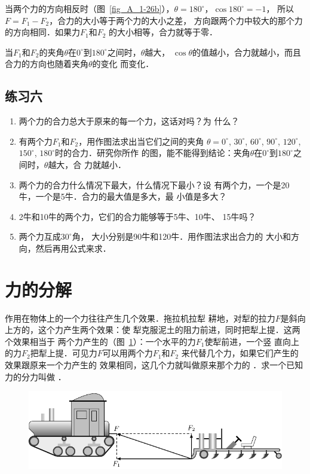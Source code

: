     当两个力的方向相反时（图~\ref{fig_A_1-26b}），$\theta =180^\circ$，$\cos 180^\circ=-1$，
所以$F=F_1-F_2$，合力的大小等于两个力的大小之差，
方向跟两个力中较大的那个力的方向相同．如果力$F_1$和$F_2$
的大小相等，合力就等于零．

    当$F_1$和$F_2$的夹角$\theta$在$0^\circ$到$180^\circ$之间时，$\theta$越大，
$\cos\theta$的值越小，合力就越小，而且合力的方向也随着夹角$\theta$的变化
而变化．


\subsection*{练习六} 
\begin{enumerate} 
\item 两个力的合力总大于原来的每一个力，这话对吗？为
什么？

\item 有两个力$F_1$和$F_2$，用作图法求出当它们之间的夹角
$\theta =0^\circ$, $30^\circ$, $60^\circ$, $90^\circ$, $120^\circ$, $150^\circ$, $180^\circ$时的合力．研究你所作
的图，能不能得到结论：夹角$\theta$在$0^\circ$到$180^\circ$之间时，$\theta $越大，合
力就越小．
\item 两个力的合力什么情况下最大，什么情况下最小？设
有两个力，一个是20牛，一个是5牛．合力的最大值是多大，最
小值是多大？
\item 2牛和10牛的两个力，它们的合力能够等于5牛、10牛、
15牛吗？
\item   两个力互成$30^\circ$角， 大小分别是90牛和120牛．用作图法求出合力的
大小和方向，然后再用公式来求．
\end{enumerate} 
    
\section{力的分解} 
作用在物体上的一个力往往产生几个效果．拖拉机拉犁
耕地，对犁的拉力$F$是斜向上方的，这个力产生两个效果：使
犁克服泥土的阻力前进，同时把犁上提．这两个效果相当于
两个力产生的（图~\ref{fig_A_1-27}）：一个水平的力$F_1$使犁前进，一个竖
直向上的力$F_2$把犁上提．可见力$F$可以用两个力$F_1$和$F_2$
来代替几个力，如果它们产生的效果跟原来一个力产生的
效果相同，这几个力就叫做原来那个力的 ．求一个已知
力的分力叫做 ．

\begin{figure}[htbp]
    \centering
    \includegraphics{fig/A/1-27.pdf} 
    \caption{} \label{fig_A_1-27} 
\end{figure} 

